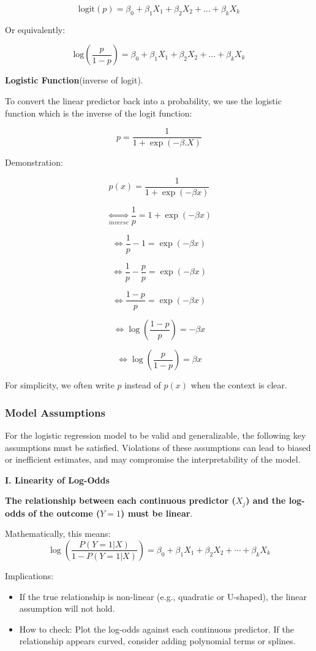 \documentclass{article}
\providecommand{\tightlist}{%
  \setlength{\itemsep}{0pt}\setlength{\parskip}{0pt}}
\begin{document}
\[\text{logit}(p) = \beta_0 + \beta_1 X_1 + \beta_2 X_2 + \ldots + \beta_k X_k\]

Or equivalently:

\[\text{log}\left( \dfrac{p}{1-p} \right) = \beta_0 + \beta_1 X_1 + \beta_2 X_2 + \ldots + \beta_k X_k\]

\medskip

\textbf{Logistic Function}(inverse of logit).

To convert the linear predictor back into a probability, we use
the logistic function which is the inverse of the logit function:

\[p = \frac{1}{1 + \exp(-\beta .X)}\]

Demonstration:

\[p(x) = \dfrac{1}{1 + \exp(-\beta x)}\]

\[\underset{inverse}   \iff \dfrac{1}{p} = 1 + \exp(-\beta x)\]

\[\iff \dfrac{1}{p} - 1 = \exp(-\beta x)\]

\[\iff \dfrac{1}{p} - \dfrac{p}{p} = \exp(-\beta x)\]

\[\iff \dfrac{1-p}{p} = \exp(-\beta x)\]

\[\iff \log(\dfrac{1-p}{p}) = -\beta x\]

\[\iff \log(\dfrac{p}{1-p}) = \beta x\]

For simplicity, we often write \(p\) instead of \(p(x)\) when the
context is clear.

\subsubsection{Model Assumptions}

For the logistic regression model to be valid and
generalizable, the following key assumptions must be satisfied.
Violations of these assumptions can lead to biased or inefficient
estimates, and may compromise the interpretability of the model.

\medskip

\textbf{I. Linearity of Log-Odds}

\textbf{The relationship between each continuous predictor (\(X_j\)) 
and the log-odds of the outcome (\(Y=1\))
must be linear}. 

Mathematically, this means:
\[\log\left(\frac{P(Y=1|X)}{1 - P(Y=1|X)}\right) = \beta_0 + \beta_1 X_1 + \beta_2 X_2 + \cdots + \beta_k X_k\]

Implications:

\begin{itemize}
\tightlist
\item
  If the true relationship is non-linear (e.g., quadratic or U-shaped),
  the linear assumption will not hold.
\item
  How to check: Plot the log-odds against each continuous
  predictor. If the relationship appears curved, consider adding
  polynomial terms or splines.
\end{itemize}
\end{document}
